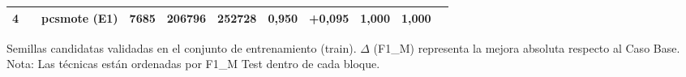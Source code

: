 \documentclass{article}
\begin{document}
\begin{table}[ht]
\begin{minipage}{\textwidth}
\begin{tabular}{cllccccccrc}
            4 & & \textbf{pcsmote (E1)} & \textbf{7685} & \textbf{206796} & \textbf{252728} & \textbf{0,950} & \textbf{+0,095} & \textbf{1,000} & \textbf{1,000} \\
            \bottomrule
        \end{tabular}
        \vspace{1mm}
        \begin{flushleft}
            \footnotesize * Semillas candidatas validadas en el conjunto de entrenamiento (train). $\Delta$ (F1\_M) representa la mejora absoluta respecto al Caso Base. Nota: Las técnicas están ordenadas por F1\_M Test dentro de cada bloque.
        \end{flushleft}
    \end{minipage}
\end{table}
\end{document}
